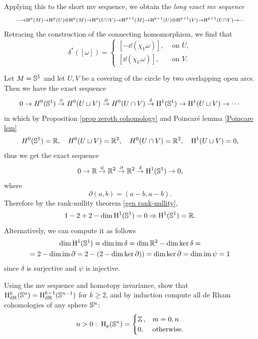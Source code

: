 Applying this to the short \gls{mv} sequence, we obtain the \emph{long exact \gls{mv} sequence}
\[
\scriptstyle
\cdots\to \mathrm{H}^p(M)\to \mathrm{H}^p(U)\oplus \mathrm{H}^p(M)\to \mathrm{H}^p(U\cap V)\to \mathrm{H}^{p+1}(M)\to \mathrm{H}^{p+1}(U)\oplus \mathrm{H}^{p+1}(V)\to \mathrm{H}^{p+1}(U\cap V)\to \cdots
\]
Retracing the construction of the connecting homomorphism, we find that 
\[\delta^\ast([\omega])=
    \begin{cases}
        [-\dd (\chi_V \omega)],& \text{ on }U,\\
        [\dd (\chi_U \omega)],& \text{ on }V.
    \end{cases}
\]

\begin{example}\label{de Rham of circle}
    Let $M=\mathbb{S}^1$ and let $U,V$ be a covering of the circle by two overlapping open arcs. Then we have the exact sequence
    \[0\to H^0(\mathbb{S}^1)\overset\psi\to H^0(U\sqcup V)\overset\partial\to H^0(U\cap V)\overset\delta\to \mathrm{H}^1(\mathbb{S}^1)\to \mathrm{H}^1(U\sqcup V)\to \cdots \]
    in which by Proposition \ref{prop zeroth cohomology} and Poincar\'e lemma \ref{Poincare lem}
    \[H^0(\mathbb{S}^1)=\mathbb{R},\quad H^0(U\sqcup V)=\mathbb{R}^2,\quad H^0(U\cap V)=\mathbb{R}^2,\quad \mathrm{H}^1(U\sqcup V)=0,\]
    thus we get the exact sequence
    \[0\to \mathbb{R}\overset\psi\to \mathbb{R}^2\overset{\partial}\to \mathbb{R}^2\overset\delta\to \mathrm{H}^1(\mathbb{S}^1)\to 0,\]
    where
    \[\partial(a,b)=(a-b,a-b).\]
    Therefore by the rank-nullity theorem \ref{gen rank-nullity},
    \[1-2+2-\dim \mathrm{H}^1(\mathbb{S}^1)=0\Rightarrow \mathrm{H}^1(\mathbb{S}^1)=\mathbb{R}.\]
    Alternatively, we can compute it as follows
    \begin{multline}
        \dim \mathrm{H}^1(\mathbb{S}^1)=\dim \operatorname{im} \delta=\dim \mathbb{R}^2-\dim\ker\delta=\\=2-\dim\operatorname{im} \partial=2-(2-\dim\ker\partial))=\dim\ker\partial=\dim\operatorname{im}\psi =1
    \end{multline}
    since $\delta$ is surjective and $\psi$ is injective.
\end{example}


\begin{xca}
    Using the \gls{mv} sequence and homotopy invariance, show that $\mathrm{H}_{\rm dR}^k(\mathbb{S}^n)=\mathrm{H}_{\rm dR}^{k-1}(\mathbb{S}^{n-1})$ for $k\geq 2$, and by induction compute all de Rham cohomologies of any sphere $\mathbb{S}^n$:
    \[n>0:\; \mathrm{H}_p(\mathbb{S}^n)=\begin{cases} \mathbb{Z}\,, & m=0,n\\ 0, & \text{otherwise.}\end{cases}\]
\end{xca}



